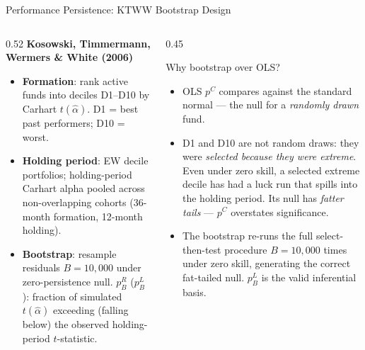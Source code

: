 \documentclass[10pt, aspectratio=169]{beamer}
\begin{document}
\begin{frame}{Performance Persistence: KTWW Bootstrap Design}
  \begin{columns}[T]
    \begin{column}{0.52\textwidth}
      \small\textbf{Kosowski, Timmermann, Wermers \& White (2006)}
      \begin{itemize}\itemsep2pt
        \item \textbf{Formation}: rank active funds into deciles D1--D10
              by Carhart $t(\hat{\alpha})$.
              D1 = best past performers; D10 = worst.
        \item \textbf{Holding period}: EW decile portfolios; holding-period
              Carhart alpha pooled across non-overlapping cohorts
              (36-month formation, 12-month holding).
        \item \textbf{Bootstrap}: resample residuals $B=10{,}000$ under
              zero-persistence null. $p^R_B$ ($p^L_B$): fraction of
              simulated $t(\hat{\alpha})$ exceeding (falling below)
              the observed holding-period $t$-statistic.
      \end{itemize}
    \end{column}
    \begin{column}{0.45\textwidth}
      \begin{block}{Why bootstrap over OLS?}
        \footnotesize
        \begin{itemize}\itemsep1pt
          \item OLS $p^C$ compares against the standard normal —
                the null for a \emph{randomly drawn} fund.
          \item D1 and D10 are not random draws: they were
                \emph{selected because they were extreme}. Even under
                zero skill, a selected extreme decile has had a luck run
                that spills into the holding period. Its null has
                \emph{fatter tails} — $p^C$ overstates significance.
          \item The bootstrap re-runs the full select-then-test procedure
                $B=10{,}000$ times under zero skill, generating the correct
                fat-tailed null. $p^L_B$ is the valid inferential basis.
        \end{itemize}
      \end{block}
    \end{column}
  \end{columns}
\end{frame}
\end{document}
